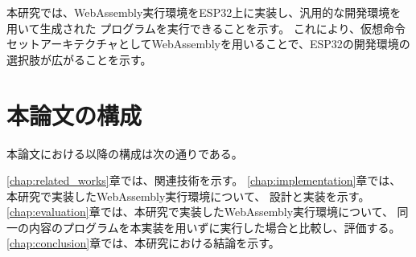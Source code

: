 本研究では、WebAssembly実行環境をESP32上に実装し、汎用的な開発環境を用いて生成された
プログラムを実行できることを示す。
これにより、仮想命令セットアーキテクチャとしてWebAssemblyを用いることで、ESP32の開発環境の
選択肢が広がることを示す。

\section{本論文の構成}

本論文における以降の構成は次の通りである。

\ref{chap:related_works}章では、関連技術を示す。
\ref{chap:implementation}章では、本研究で実装したWebAssembly実行環境について、
設計と実装を示す。
\ref{chap:evaluation}章では、本研究で実装したWebAssembly実行環境について、
同一の内容のプログラムを本実装を用いずに実行した場合と比較し、評価する。
\ref{chap:conclusion}章では、本研究における結論を示す。
